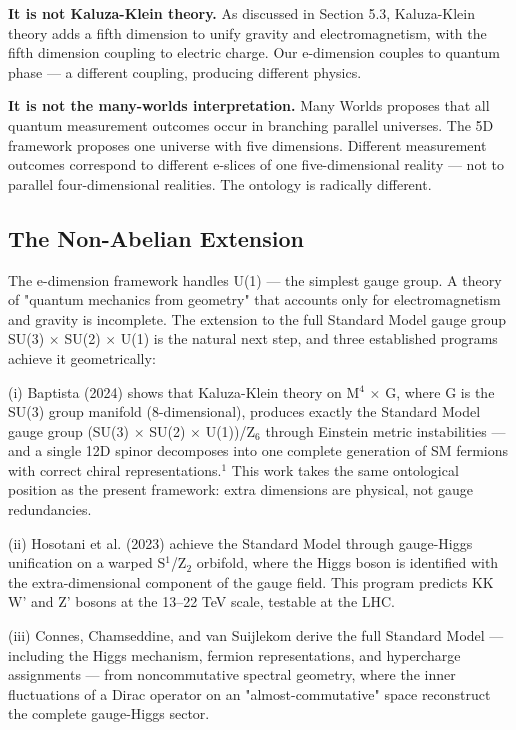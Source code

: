 \documentclass[aps,prd,preprint,superscriptaddress,longbibliography,floatfix]{revtex4-2}
\theoremstyle{remark}
\begin{document}
\textbf{It is not Kaluza-Klein theory.} As discussed in Section 5.3, Kaluza-Klein theory adds a fifth dimension to unify gravity and electromagnetism, with the fifth dimension coupling to electric charge. Our e-dimension couples to quantum phase --- a different coupling, producing different physics.

\textbf{It is not the many-worlds interpretation.} Many Worlds proposes that all quantum measurement outcomes occur in branching parallel universes. The 5D framework proposes one universe with five dimensions. Different measurement outcomes correspond to different e-slices of one five-dimensional reality --- not to parallel four-dimensional realities. The ontology is radically different.



\subsection{The Non-Abelian Extension}

The e-dimension framework handles U(1) --- the simplest gauge group. A theory of "quantum mechanics from geometry" that accounts only for electromagnetism and gravity is incomplete. The extension to the full Standard Model gauge group SU(3) $\times$ SU(2) $\times$ U(1) is the natural next step, and three established programs achieve it geometrically:

(i) Baptista (2024) shows that Kaluza-Klein theory on M$^{4}$ $\times$ G, where G is the SU(3) group manifold (8-dimensional), produces exactly the Standard Model gauge group (SU(3) $\times$ SU(2) $\times$ U(1))/Z$_{6}$ through Einstein metric instabilities --- and a single 12D spinor decomposes into one complete generation of SM fermions with correct chiral representations.$^{1}$ This work takes the same ontological position as the present framework: extra dimensions are physical, not gauge redundancies.

(ii) Hosotani et al. (2023) achieve the Standard Model through gauge-Higgs unification on a warped S$^{1}$/Z$_{2}$ orbifold, where the Higgs boson is identified with the extra-dimensional component of the gauge field. This program predicts KK W' and Z' bosons at the 13--22 TeV scale, testable at the LHC.

(iii) Connes, Chamseddine, and van Suijlekom derive the full Standard Model --- including the Higgs mechanism, fermion representations, and hypercharge assignments --- from noncommutative spectral geometry, where the inner fluctuations of a Dirac operator on an "almost-commutative" space reconstruct the complete gauge-Higgs sector.
\end{document}
